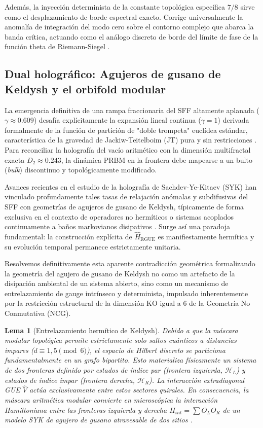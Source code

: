 \documentclass[aps,prl,preprint,superscriptaddress,floatfix]{revtex4-2}
\newtheorem{lemma}[theorem]{Lema}
\newcommand{\Hilb}{\mathcal{H}}
\begin{document}
Además, la inyección determinista de la constante topológica específica $7/8$ sirve como el desplazamiento de borde espectral exacto. Corrige universalmente la anomalía de integración del modo cero sobre el contorno complejo que abarca la banda crítica, actuando como el análogo discreto de borde del límite de fase de la función theta de Riemann-Siegel \cite{Corless1996, Borwein2008}.

\subsection{Dual holográfico: Agujeros de gusano de Keldysh y el orbifold modular}

La emergencia definitiva de una rampa fraccionaria del SFF altamente aplanada ($\gamma \approx 0.609$) desafía explícitamente la expansión lineal continua ($\gamma = 1$) derivada formalmente de la función de partición de "doble trompeta" euclídea estándar, característica de la gravedad de Jackiw-Teitelboim (JT) pura y sin restricciones \cite{Saad2019, Cotler2017}. Para reconciliar la holografía del vacío aritmético con la dimensión multifractal exacta $D_2 \approx 0.243$, la dinámica PRBM en la frontera debe mapearse a un bulto (\textit{bulk}) discontinuo y topológicamente modificado.

Avances recientes en el estudio de la holografía de Sachdev-Ye-Kitaev (SYK) han vinculado profundamente tales tasas de relajación anómalas y subdifusivas del SFF con geometrías de agujeros de gusano de Keldysh, típicamente de forma exclusiva en el contexto de operadores no hermíticos o sistemas acoplados continuamente a baños markovianos disipativos \cite{Zheng2023b, GarciaGarcia2023, Arias2024}. Surge así una paradoja fundamental: la construcción explícita de $\hat{H}_{\text{RGUE}}$ es manifiestamente hermítica y su evolución temporal permanece estrictamente unitaria.

Resolvemos definitivamente esta aparente contradicción geométrica formalizando la geometría del agujero de gusano de Keldysh no como un artefacto de la disipación ambiental de un sistema abierto, sino como un mecanismo de entrelazamiento de gauge intrínseco y determinista, impulsado inherentemente por la restricción estructural de la dimensión KO igual a 6 de la Geometría No Conmutativa (NCG).

\begin{lemma}[Entrelazamiento hermítico de Keldysh]
\label{lemma:keldysh_hermitian_entanglement}
Debido a que la máscara modular topológica permite estrictamente solo saltos cuánticos a distancias impares ($d \equiv 1, 5 \pmod 6$), el espacio de Hilbert discreto se particiona fundamentalmente en un grafo bipartito. Esto materializa físicamente un sistema de dos fronteras definido por estados de índice par (frontera izquierda, $\Hilb_L$) y estados de índice impar (frontera derecha, $\Hilb_R$). La interacción extradiagonal GUE $\hat{V}$ actúa \emph{exclusivamente} entre estos sectores quirales. En consecuencia, la máscara aritmética modular convierte en microscópica la interacción Hamiltoniana entre las fronteras izquierda y derecha $H_{int} = \sum O_L O_R$ de un modelo SYK de agujero de gusano atravesable de dos sitios \cite{Zheng2024}.
\end{lemma}
\end{document}
